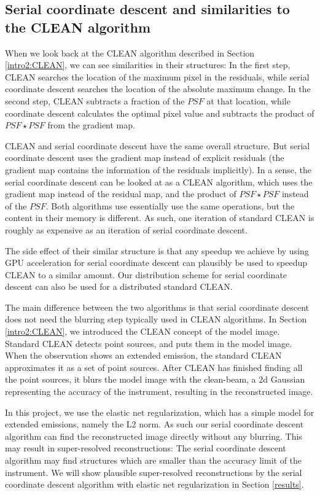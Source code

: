 \subsection{Serial coordinate descent and similarities to the CLEAN algorithm}\label{cd:similarities}
When we look back at the CLEAN algorithm described in Section \ref{intro2:CLEAN}, we can see similarities in their structures: In the first step, CLEAN searches the location of the maximum pixel in the residuals, while serial coordinate descent searches the location of the absolute maximum change. In the second step, CLEAN subtracts a fraction of the $PSF$ at that location, while coordinate descent calculates the optimal pixel value and subtracts the product of $PSF \star PSF$ from the gradient map. 

CLEAN and serial coordinate descent have the same overall structure. But serial coordinate descent uses the gradient map instead of explicit residuals (the gradient map contains the information of the residuals implicitly). In a sense, the serial coordinate descent can be looked at as a CLEAN algorithm, which uses the gradient map instead of the residual map, and the product of $PSF \star PSF$ instead of the $PSF$. Both algorithms use essentially use the same operations, but the content in their memory is different. As such, one iteration of standard CLEAN is roughly as expensive as an iteration of serial coordinate descent. 

The side effect of their similar structure is that any speedup we achieve by using GPU acceleration for serial coordinate descent can plausibly be used to speedup CLEAN to a similar amount. Our distribution scheme for serial coordinate descent can also be used for a distributed standard CLEAN. 

The main difference between the two algorithms is that serial coordinate descent does not need the blurring step typically used in CLEAN algorithms. In Section \ref{intro2:CLEAN}, we introduced the CLEAN concept of the model image. Standard CLEAN detects point sources, and puts them in the model image. When the observation shows an extended emission, the standard CLEAN approximates it as a set of point sources. After CLEAN has finished finding all the point sources, it blurs the model image with the clean-beam, a 2d Gaussian representing the accuracy of the instrument, resulting in the reconstructed image.

In this project, we use the elastic net regularization, which has a simple model for extended emissions, namely the L2 norm. As such our serial coordinate descent algorithm can find the reconstructed image directly without any blurring. This may result in super-resolved reconstructions: The serial coordinate descent algorithm may find structures which are smaller than the accuracy limit of the instrument. We will show plausible super-resolved reconstructions by the serial coordinate descent algorithm with elastic net regularization in Section \ref{results}.


